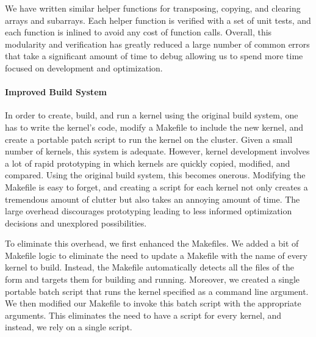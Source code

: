 We have written similar helper functions for transposing, copying, and clearing
arrays and subarrays. Each helper function is verified with a set of unit
tests, and each function is inlined to avoid any cost of function calls.
Overall, this modularity and verification has greatly reduced a large number of
common errors that take a significant amount of time to debug allowing us to
spend more time focused on development and optimization.

\paragraph{Improved Build System}
In order to create, build, and run a kernel using the original  build
system, one has to write the kernel's code, modify a Makefile to include the
new kernel, and create a portable patch script to run the kernel on the
cluster. Given a small number of kernels, this system is adequate. However,
kernel development involves a lot of rapid prototyping in which kernels are
quickly copied, modified, and compared. Using the original build system, this
becomes onerous. Modifying the Makefile is easy to forget, and creating a
script for each kernel not only creates a tremendous amount of clutter but also
takes an annoying amount of time. The large overhead discourages prototyping
leading to less informed optimization decisions and unexplored possibilities.

To eliminate this overhead, we first enhanced the Makefiles. We added a bit of
Makefile logic to eliminate the need to update a Makefile with the name of
every kernel to build. Instead, the Makefile automatically detects all the
files of the form  and targets them for building and
running. Moreover, we created a single portable batch script that runs the
kernel specified as a command line argument. We then modified our Makefile to
invoke this batch script with the appropriate arguments. This eliminates the
need to have a script for every kernel, and instead, we rely on a single
script.

